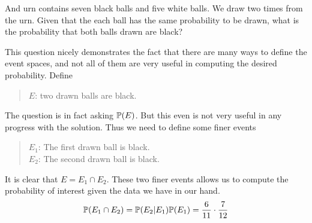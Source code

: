 \begin{problem}
	And urn contains seven black balls and five white balls. We draw two times from the urn. Given that the each ball has the same probability to be drawn, what is the probability that both balls drawn are black?
\end{problem}
\begin{solution}
	This question nicely demonstrates the fact that there are many ways to define the event spaces, and not all of them are very useful in computing the desired probability. Define
	\begin{quote}
		$E$: two drawn balls are black.
	\end{quote}
	The question is in fact asking $\mathbb{P}(E)$. But this even is not very useful in any progress with the solution. Thus we need to define some finer events
	\begin{quote}
		$E_1$: The first drawn ball is black.\\
		$E_2$: The second drawn ball is black.
	\end{quote}
	It is clear that $E = E_1 \cap E_2$. These two finer events allows us to compute the probability of interest given the data we have in our hand.
	\[ \mathbb{P}(E_1 \cap E_2) = \mathbb{P}(E_2 | E_1) \mathbb{P}(E_1) = \frac{6}{11} \cdot \frac{7}{12} \]
\end{solution}

